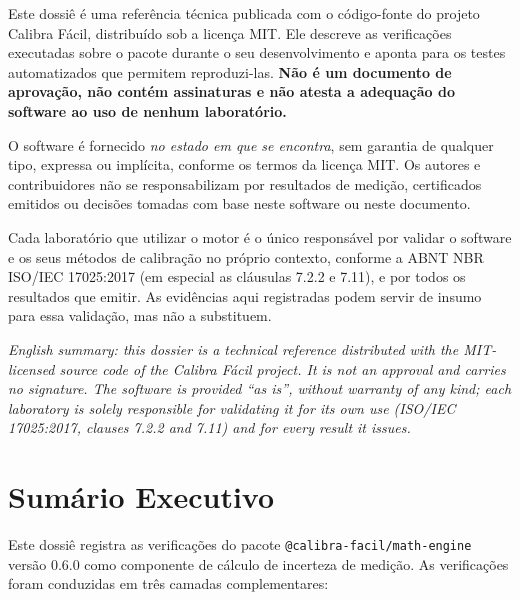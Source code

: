 \documentclass[11pt,a4paper]{article}
\newcommand{\docVersion}{0.6.0}
\begin{document}
Este dossiê é uma referência técnica publicada com o código-fonte do projeto Calibra Fácil, distribuído sob a licença MIT. Ele descreve as verificações executadas sobre o pacote durante o seu desenvolvimento e aponta para os testes automatizados que permitem reproduzi-las. \textbf{Não é um documento de aprovação, não contém assinaturas e não atesta a adequação do software ao uso de nenhum laboratório.}

O software é fornecido \emph{no estado em que se encontra}, sem garantia de qualquer tipo, expressa ou implícita, conforme os termos da licença MIT. Os autores e contribuidores não se responsabilizam por resultados de medição, certificados emitidos ou decisões tomadas com base neste software ou neste documento.

Cada laboratório que utilizar o motor é o único responsável por validar o software e os seus métodos de calibração no próprio contexto, conforme a ABNT NBR ISO/IEC 17025:2017 (em especial as cláusulas 7.2.2 e 7.11), e por todos os resultados que emitir. As evidências aqui registradas podem servir de insumo para essa validação, mas não a substituem.

\vspace{0.2cm}
{\small\itshape English summary: this dossier is a technical reference distributed with the MIT-licensed source code of the Calibra Fácil project. It is not an approval and carries no signature. The software is provided ``as is'', without warranty of any kind; each laboratory is solely responsible for validating it for its own use (ISO/IEC 17025:2017, clauses 7.2.2 and 7.11) and for every result it issues.}

\tableofcontents

\clearpage

\section{Sumário Executivo}

Este dossiê registra as verificações do pacote \texttt{@calibra-facil/math-engine} versão \docVersion{} como componente de cálculo de incerteza de medição. As verificações foram conduzidas em três camadas complementares:
\end{document}
